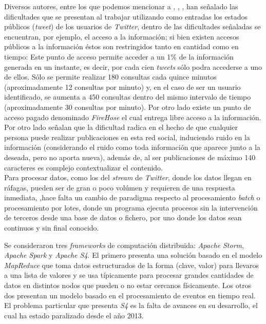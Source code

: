 Diversos autores, entre los que podemos mencionar a \cite{VanDeVoort}, \cite{EventDetectionInTwitter}, \cite{Maldonado}, han señalado las dificultades que se presentan al trabajar utilizando como entradas los estados públicos (\textit{tweet}) de los usuarios de \textit{Twitter}, dentro de las dificultades señaladas se encuentran, por ejemplo, el acceso a la información; si bien existen accesos públicos a la información éstos son restringidos tanto en cantidad como en tiempo: Este punto de acceso permite acceder a un 1\% de la información generada en un instante, es decir, por cada cien \textit{tweets} sólo podra accederse a uno de ellos. Sólo se permite realizar 180 consultas cada quince minutos (aproximadamente 12 consultas por minuto) y, en el caso de ser un usuario identificado, se aumenta a 450 consultas dentro del mismo intervalo de tiempo (aproximadamente 30 consultas por minuto). Por otro lado existe un punto de acceso pagado denominado \textit{FireHose} el cual entrega libre acceso a la información.\\

Por otro lado \cite{VanDeVoort} señalan que la dificultad radica en el hecho de que cualquier persona puede realizar publicaciones en esta red social, induciendo ruido en la información (considerando el ruido como toda información que aparece junto a la deseada, pero no aporta nueva), además de, al ser publicaciones de máximo 140 caracteres es complejo contextualizar el contenido.\\ 	

Para procesar datos, como los del \textit{stream} de \textit{Twitter}, donde los datos llegan en ráfagas, pueden ser de gran o poco volúmen y requieren de una respuesta inmediata, \cite{HarwoodPeter},hace falta un cambio de paradigma respecto al procesamiento \textit{batch} o procesamiento por lotes, donde un programa ejecuta procesos sin la intervención de terceros desde una base de datos o fichero, por uno donde los datos sean continuos y sin final conocido.
 
Se consideraron tres \textit{frameworks} de computación distribuida: \textit{Apache Storm}, \textit{Apache Spark} y \textit{Apache S4}. El primero presenta una solución basado en el modelo \textit{MapReduce} que toma datos estructurados de la forma (clave, valor) para llevaros a una lista de valores y se usa típicamente para procesar grandes cantidades de datos en distintos nodos que pueden o no estar cercanos físicamente. Los otros dos presentan un modelo basado en el procesamiento de eventos en tiempo real. El problema particular que presenta \textit{S4} es la falta de avances en su desarrollo, el cual ha estado paralizado desde el año 2013.\\ 

